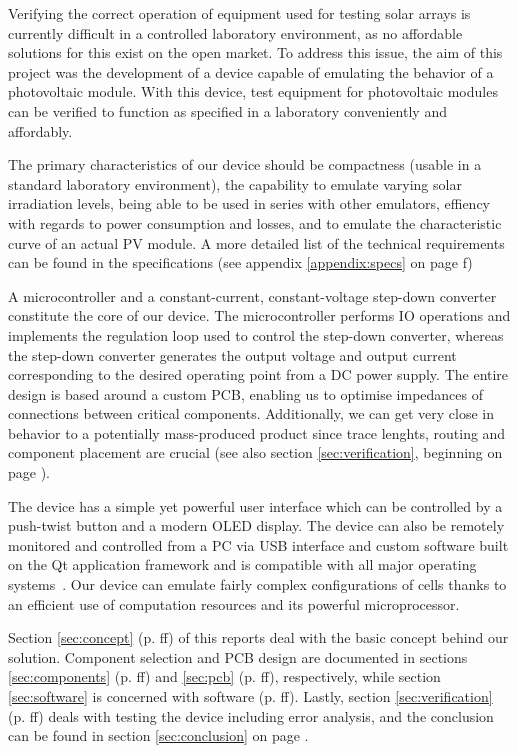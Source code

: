 

Verifying the correct operation of equipment  used for testing solar arrays is
currently difficult in  a controlled laboratory environment,  as no affordable
solutions for this exist on the open market. To address this issue, the aim of
this project was the development of a device capable of emulating the behavior
of a  photovoltaic module. With this  device, test equipment  for photovoltaic
modules can be verified to function  as specified in a laboratory conveniently
and affordably.

The primary characteristics  of our device should be compactness  (usable in a
standard  laboratory environment),  the  capability to  emulate varying  solar
irradiation levels,  being able  to be  used in  series with  other emulators,
effiency with  regards to  power consumption  and losses,  and to  emulate the
characteristic  curve of  an actual  PV module. A  more detailed  list of  the
technical  requirements  can be  found  in  the specifications  (see  appendix
\ref{appendix:specs} on page \pageref{appendix:specs}f)

A microcontroller and a constant-current, constant-voltage step-down converter
constitute the core of our device.  The microcontroller performs IO operations
and implements  the regulation loop  used to control the  step-down converter,
whereas  the  step-down converter  generates  the  output voltage  and  output
current  corresponding  to  the  desired  operating  point  from  a  DC  power
supply. The  entire design  is  based  around a  custom  PCB,  enabling us  to
optimise impedances of  connections between critical components. Additionally,
we can get very close in behavior to a potentially mass-produced product since
trace lenghts, routing  and component placement are crucial  (see also section
\ref{sec:verification}, beginning on page \pageref{sec:verification}).

The device has a simple yet powerful user interface which can be controlled by
a push-twist button and a modern OLED display. The device can also be remotely
monitored and controlled from a PC via USB interface and custom software built
on the  Qt application framework  and is  compatible with all  major operating
systems~\cite{ref:qt}.  Our  device can emulate fairly  complex configurations
of cells thanks to an efficient  use of computation resources and its powerful
microprocessor.

Section  \ref{sec:concept}   (p.  \pageref{sec:concept}ff)  of   this  reports
deal  with   the  basic  concept  behind   our  solution. Component  selection
and   PCB  design   are  documented   in  sections   \ref{sec:components}  (p.
\pageref{sec:components}ff)   and   \ref{sec:pcb}  (p.   \pageref{sec:pcb}ff),
respectively,  while section  \ref{sec:software}  is  concerned with  software
(p.  \pageref{sec:software}ff).   Lastly, section  \ref{sec:verification}  (p.
\pageref{sec:verification}ff) deals  with testing  the device  including error
analysis, and the  conclusion can be found in  section \ref{sec:conclusion} on
page \pageref{sec:conclusion}.
